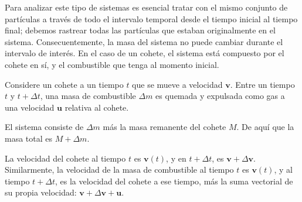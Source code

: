 Para analizar este tipo de sistemas es esencial tratar con el mismo conjunto de partículas a través de todo el intervalo temporal desde el tiempo inicial al tiempo final; debemos rastrear todas las partículas que estaban originalmente en el sistema. Consecuentemente, la masa del sistema no puede cambiar durante el intervalo de interés. En el caso de un cohete, el sistema está compuesto por el cohete en sí, y el combustible que tenga al momento inicial. 



Considere un cohete a un tiempo $t$ que se mueve a velocidad $\mathbf{v}$. Entre un tiempo $t$ y $t+\Delta t$, una masa de combustible $\Delta m$ es quemada y expulsada como gas a una velocidad $\mathbf{u}$ relativa al cohete.

El sistema consiste de $\Delta m$ más la masa remanente del cohete $M$. De aquí que la masa total es $M+\Delta m$.

La velocidad del cohete al tiempo $t$ es $\mathbf{v}(t)$, y en $t+\Delta t$, es $\mathbf{v}+\Delta\mathbf{v}$. Similarmente, la velocidad de la masa de combustible al tiempo $t$ es $\mathbf{v}(t)$, y al tiempo $t+\Delta t$, es la velocidad del cohete a ese tiempo, más la suma vectorial de su propia velocidad: $\mathbf{v}+\Delta\mathbf{v}+\mathbf{u}$. 

